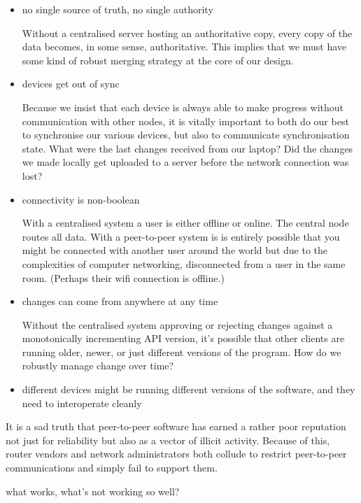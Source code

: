 \documentclass[sigplan,10pt]{acmart}
\begin{document}
\begin{itemize}
	\item no single source of truth, no single authority

	Without a centralised server hosting an authoritative copy, every copy of the data becomes, in some sense, authoritative. This implies that we must have some kind of robust merging strategy at the core of our design.
	
	\item devices get out of sync

    Because we insist that each device is always able to make progress without communication with other nodes, it is vitally important to both do our best to synchronise our various devices, but also to communicate synchronisation state. What were the last changes received from our laptop? Did the changes we made locally get uploaded to a server before the network connection was lost?  

    \item connectivity is non-boolean

    With a centralised system a user is either offline or online. The central node routes all data. With a peer-to-peer system is is entirely possible that you might be connected with another user around the world but due to the complexities of computer networking, disconnected from a user in the same room. (Perhaps their wifi connection is offline.) 

    \item changes can come from anywhere at any time

    Without the centralised system approving or rejecting changes against a monotonically incrementing API version, it's possible that other clients are running older, newer, or just different versions of the program. How do we robustly manage change over time?
    
    \item different devices might be running different versions of the software, and they need to interoperate cleanly
\end{itemize}

It is a sad truth that peer-to-peer software has earned a rather poor reputation not just for reliability but also as a vector of illicit activity. Because of this, router vendors and network administrators both collude to restrict peer-to-peer communications and simply fail to support them.

what works, what's not working so well?
\end{document}

